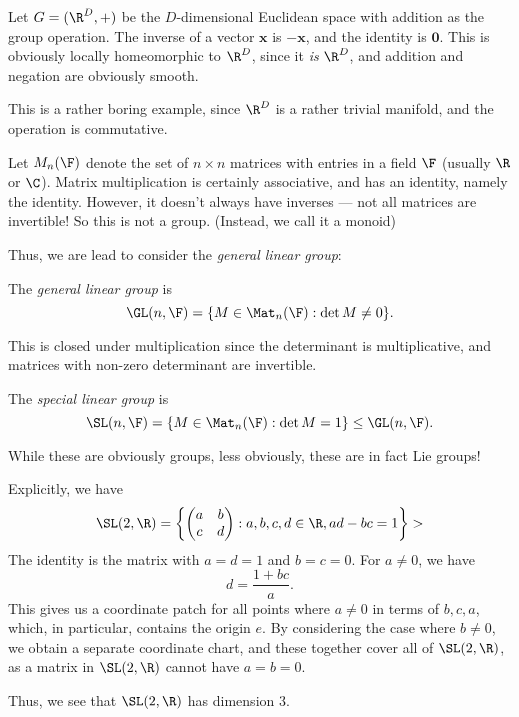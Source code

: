 \documentclass[a4paper]{article}
\begin{document}
\begin{eg}
  Let $G = (\R^D, +)$ be the $D$-dimensional Euclidean space with addition as the group operation. The inverse of a vector $\mathbf{x}$ is $-\mathbf{x}$, and the identity is $\mathbf{0}$. This is obviously locally homeomorphic to $\R^D$, since it \emph{is} $\R^D$, and addition and negation are obviously smooth.
\end{eg}

This is a rather boring example, since $\R^D$ is a rather trivial manifold, and the operation is commutative.

\begin{eg}
  Let $M_n(\F)$ denote the set of $n\times n$ matrices with entries in a field $\F$ (usually $\R$ or $\C$). Matrix multiplication is certainly associative, and has an identity, namely the identity. However, it doesn't always have inverses --- not all matrices are invertible! So this is not a group. (Instead, we call it a monoid)
\end{eg}
Thus, we are lead to consider the \emph{general linear group}:

\begin{defi}
  The \emph{general linear group} is
  \[
    \GL(n, \F) = \{M \in \Mat_n(\F): \det M \not= 0\}.
  \]
\end{defi}
This is closed under multiplication since the determinant is multiplicative, and matrices with non-zero determinant are invertible.

\begin{defi}
  The \emph{special linear group} is
  \[
    \SL(n, \F) = \{M \in \Mat_n(\F): \det M =1\} \leq \GL(n, \F).
  \]
\end{defi}
While these are obviously groups, less obviously, these are in fact Lie groups!

\begin{eg}
  Explicitly, we have
  \[
    \SL(2, \R) = \left\{
      \begin{pmatrix}
        a & b\\
        c & d
      \end{pmatrix}:
    a, b, c, d \in \R, ad - bc = 1\right\}>
  \]
  The identity is the matrix with $a = d = 1$ and $b = c = 0$. For $a \not= 0$, we have
  \[
    d = \frac{1 + bc}{a}.
  \]
  This gives us a coordinate patch for all points where $a \not= 0$ in terms of $b, c, a$, which, in particular, contains the origin $e$. By considering the case where $b \not= 0$, we obtain a separate coordinate chart, and these together cover all of $\SL(2, \R)$, as a matrix in $\SL(2, \R)$ cannot have $a = b = 0$.

  Thus, we see that $\SL(2, \R)$ has dimension $3$.
\end{eg}
\end{document}
